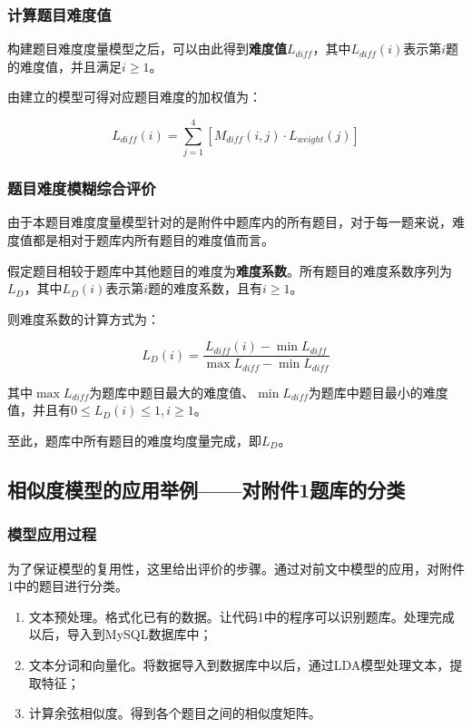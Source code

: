 \subsubsection{计算题目难度值}

构建题目难度度量模型之后，可以由此得到\textbf{难度值}$L_{diff}$，其中$L_{diff}(i)$表示第$i$题的难度值，并且满足$i \geq 1$。

由建立的模型可得对应题目难度的加权值为：

\begin{equation}
    L_{diff}(i) = 
    \sum_{j = 1}^{4} \left [ 
        M_{diff}(i, j) \cdot L_{weight}(j)
    \right ]
\end{equation}

\subsubsection{题目难度模糊综合评价}

由于本题目难度度量模型针对的是附件中题库内的所有题目，对于每一题来说，难度值都是相对于题库内所有题目的难度值而言。

假定题目相较于题库中其他题目的难度为\textbf{难度系数}。所有题目的难度系数序列为$L_D$，其中$L_D(i)$表示第$i$题的难度系数，且有$i \geq 1$。

则难度系数的计算方式为：

\begin{equation}
L_D(i) = 
    \frac{
        L_{diff}(i) - \min L_{diff}
    } {
        \max L_{diff} - \min L_{diff}
    }
\end{equation}

其中$\max L_{diff}$为题库中题目最大的难度值、$\min L_{diff}$为题库中题目最小的难度值，并且有$0 \leq L_D(i) \leq 1, i \geq 1$。

至此，题库中所有题目的难度均度量完成，即$L_D$。

\subsection{相似度模型的应用举例——对附件1题库的分类}

\subsubsection{模型应用过程}

为了保证模型的复用性，这里给出评价的步骤。通过对前文中模型的应用，对附件1中的题目进行分类。

\begin{enumerate}
    \item 文本预处理。格式化已有的数据。让代码1中的程序可以识别题库。处理完成以后，导入到MySQL数据库中；
    \item 文本分词和向量化。将数据导入到数据库中以后，通过LDA模型处理文本，提取特征；
    \item 计算余弦相似度。得到各个题目之间的相似度矩阵。
\end{enumerate}


